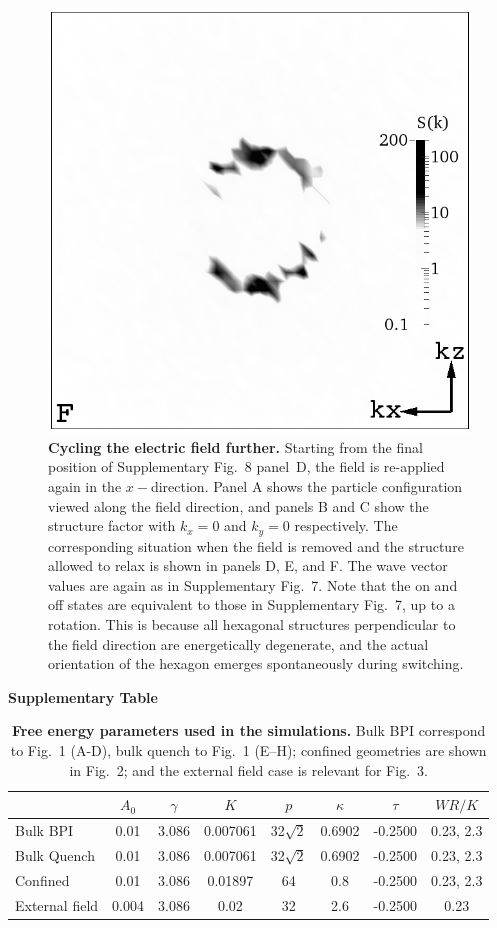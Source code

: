 \documentclass[12pt,twoside]{article}
\begin{document}
\begin{figure}[!h]
\begin{center}
\includegraphics[width=0.32\columnwidth]{sq_y_run1347.png}
\end{center}
\caption{\textbf{Cycling the electric field further.}
Starting from the final
position of Supplementary Fig.~8 panel~D, the field is re-applied
again in the $x-$direction. Panel A shows the particle configuration
viewed along the field direction, and panels B and C show the structure
factor with $k_x = 0$ and $k_y = 0$ respectively. The corresponding
situation when the field is removed and the structure allowed to relax
is shown in panels D, E, and F. The wave vector values are again as
in Supplementary Fig.~7. Note that the on and off states are 
equivalent to those in Supplementary Fig.~7, up to a rotation.
This is because all hexagonal structures perpendicular to the field
direction are energetically degenerate,
and the actual orientation of the hexagon emerges spontaneously during
switching. }
\end{figure}


\vfill\pagebreak


{\bf Supplementary Table}

\begin{table}[h]
\begin{center}
\begin{tabular}{|l|c|c|c|c|c|c|c|}
\hline
         & $A_0$ & $\gamma$ & $K$ & $p$ & $\kappa$ & $\tau$ & $WR/K$\\
\hline 
Bulk BPI & 0.01 & 3.086 & 0.007061 & 32$\sqrt{2}$ & 0.6902 & -0.2500 &
0.23, 2.3\\
\hline
Bulk Quench & 0.01 & 3.086 & 0.007061 & 32$\sqrt{2}$ & 0.6902 & -0.2500 &
0.23, 2.3 \\
\hline
Confined & 0.01 & 3.086 & 0.01897 & 64 & 0.8 & -0.2500 & 0.23, 2.3\\
\hline
External field & 0.004& 3.086 & 0.02 & 32 & 2.6 & -0.2500 & 0.23\\ 
\hline
\end{tabular}
\end{center}
\caption{\textbf{Free energy parameters used in the simulations.} Bulk BPI
correspond to Fig.~1 (A-D), bulk quench to Fig.~1 (E--H); confined
geometries are shown in Fig.~2; and the external field case is
relevant for Fig.~3.}
\label{table:params}
\end{table}
\end{document}
